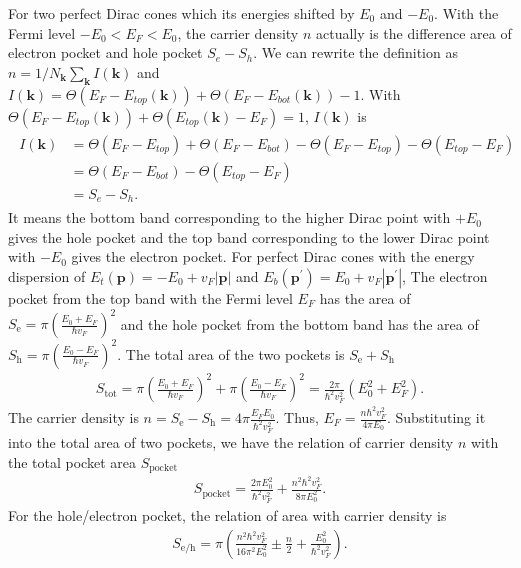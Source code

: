 \documentclass[10pt, oneside]{article}
\newcommand{\mr}[1]{\mathrm{#1}}
\newcommand{\p}[1]{\left(#1\right)}
\begin{document}
For two perfect Dirac cones which its energies shifted by \(E_0\) and \(-E_0\). With the Fermi level \(-E_0 < E_F < E_0\), the carrier density \(n\) actually is the difference area of electron pocket and hole pocket \(S_{e} - S_{h}\). We can rewrite the definition as \(n = 1/N_{\bm{k}} \sum_{\bm{k}} I \p{\bm{k}}\) and \(I \p{\bm{k}} = \Theta \p{E_{F} - E_{top}\p{\bm{k}}} + \Theta\p{E_{F} - E_{bot}\p{\bm{k}}} - 1\). With \(\Theta\p{E_F - E_{top} \p{\bm{k}}} + \Theta \p{E_{top} \p{\bm{k}} - E_{F}} = 1\), \(I \p{\bm{k}}\) is 
\begin{align}
	\begin{split}
		I \p{\bm{k}} & = \Theta \p{E_F - E_{top}} + \Theta \p{E_F - E_{bot}} - \Theta \p{E_{F} - E_{top}} - \Theta \p{E_{top} - E_{F}} \\
		& = \Theta \p{E_F - E_{bot}} - \Theta \p{E_{top} - E_{F}} \\
		& = S_{e} - S_{h}.
	\end{split}
\end{align}
It means the bottom band corresponding to the higher Dirac point with \(+ E_0\) gives the hole pocket and the top band corresponding to the lower Dirac point with \(- E_0\) gives the electron pocket. For perfect Dirac cones with the energy dispersion of \(E_{t}\p{\bm{p}} =  - E_0 + v_F |\bm{p}|\) and \(E_{b}\p{\bm{p}^\prime} = E_0 + v_F |\bm{p}^\prime|\), The electron pocket from the top band with the Fermi level \(E_F\) has the area of \(S_{\mr{e}} = \pi \p{\frac{E_0 + E_F}{\hbar v_F}}^2\) and the hole pocket from the bottom band has the area of \(S_{\mr{h}} = \pi \p{\frac{E_0 - E_F}{\hbar v_F}}^2\). The total area of the two pockets is \(S_{\mr{e}} + S_{\mr{h}}\)
\begin{align}
	S_{\mr{tot}} = \pi \p{\frac{E_0 + E_F}{\hbar v_F}}^2 + \pi \p{\frac{E_0 - E_F}{\hbar v_F}}^2 = \frac{2 \pi}{\hbar^2  v_F^2} \p{E_0^2 + E_F^2}.
\end{align}
The carrier density is \(n = S_{\mr{e}} - S_{\mr{h}} = 4 \pi \frac{E_F E_0}{\hbar^2 v_F^2}\). Thus, \(E_F = \frac{n \hbar^2 v_F^2}{4 \pi E_0}\). Substituting it into the total area of two pockets, we have the relation of carrier density \(n\) with the total pocket area \(S_{\mr{pocket}}\) 
\begin{align}
	S_{\mr{pocket}} = \frac{2 \pi E_0^2}{\hbar^2 v_F^2}  + \frac{n^2 \hbar^2 v_F^2}{8 \pi E_0^2}.
\end{align}
For the hole/electron pocket, the relation of area with carrier density is 
\begin{align}
	S_{\mr{e/h}} = \pi \p{ \frac{n^2 \hbar^2 v^{2}_{F}}{16 \pi^2 E^2_0} \pm \frac{n}{2}+ \frac{E_0^2}{\hbar^2 v_F^2}}.
\end{align}
\end{document}

